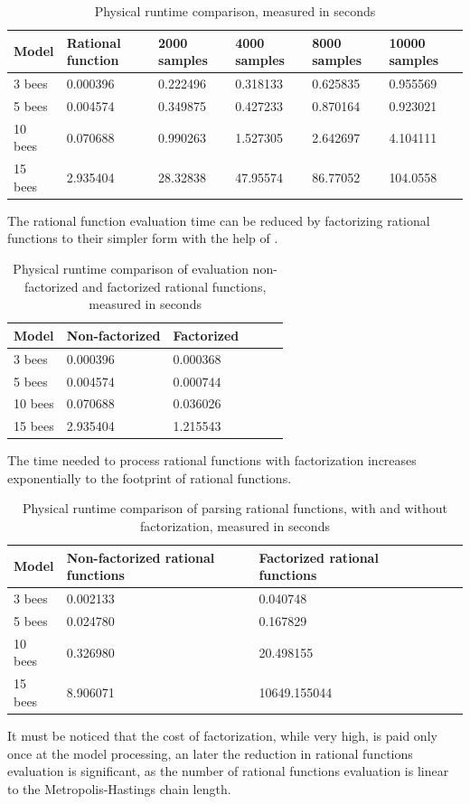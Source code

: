 \documentclass[12pt]{article}
\theoremstyle{definition}
\begin{document}
\begin{table}[H]
  \begin{tabular}{|l|l|l|l|l|l|}
    \hline
    Model   & Rational function  & 2000 samples & 4000 samples  & 8000 samples  & 10000 samples  \\ \hline
    3 bees  & 0.000396   & 0.222496  & 0.318133 & 0.625835 & 0.955569 \\ \hline
    5 bees  & 0.004574   & 0.349875  & 0.427233 & 0.870164 & 0.923021 \\ \hline
    10 bees & 0.070688   & 0.990263  & 1.527305 & 2.642697 & 4.104111 \\ \hline
    15 bees & 2.935404   & 28.32838  & 47.95574 & 86.77052 & 104.0558 \\ \hline
  \end{tabular}
  \caption{Physical runtime comparison, measured in seconds}
\end{table}

The rational function evaluation time can be reduced by factorizing rational
functions to their simpler form with the help of \cite{meurer2017sympy}. \\
\begin{table}[H]
  \begin{tabular}{|l|l|l|l|l|l|}
    \hline
    Model   & Non-factorized  & Factorized  \\ \hline
    3 bees  & 0.000396   & 0.000368 \\ \hline
    5 bees  & 0.004574   & 0.000744 \\ \hline
    10 bees & 0.070688   & 0.036026 \\ \hline
    15 bees & 2.935404   & 1.215543 \\ \hline
  \end{tabular}
  \caption{Physical runtime comparison of evaluation non-factorized and
    factorized rational functions, measured in seconds}
\end{table}

The time needed to process rational functions with factorization
increases exponentially to the footprint of rational functions. 
\begin{table}[H]
  \begin{tabular}{|l|l|l|l|l|l|}
    \hline
    Model   & Non-factorized rational functions & Factorized rational functions \\ \hline
    3 bees  & 0.002133   & 0.040748 \\ \hline
    5 bees  & 0.024780   & 0.167829 \\ \hline
    10 bees & 0.326980   & 20.498155 \\ \hline
    15 bees & 8.906071   & 10649.155044 \\ \hline
  \end{tabular}
  \caption{Physical runtime comparison of parsing rational functions, with and
    without factorization, measured in seconds}
\end{table}
It must be noticed that the cost of factorization, while very high, is paid only
once at the model processing, an later the reduction in rational functions
evaluation is significant, as the number of rational functions evaluation is
linear to the Metropolis-Hastings chain length.
\end{document}
